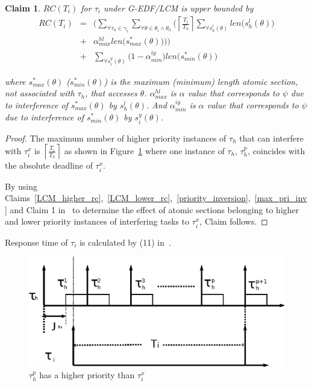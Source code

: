 \documentclass[conference]{IEEEtran}
\newtheorem{clm}{Claim}
\begin{document}
\begin{clm}\label{GEDF/LCM response time}
$RC(T_i)$ for $\tau_i$ under G-EDF/LCM is upper bounded by
\begin{eqnarray}
RC(T_i) & = & \Bigg(\sum_{\forall \tau_h \in \gamma_i}\sum_{\forall\theta \in \theta_i \wedge \theta_h}\Bigg(\left\lceil\frac{T_{i}}{T_{h}}\right\rceil\sum_{\forall s_{h}^{l}(\theta)}len\Big(s_{h}^{l}(\theta)\Big)\nonumber\\
& + & \alpha_{max}^{hl}len\Big(s_{max}^{*}(\theta)\Big)\Bigg)\Bigg)\nonumber\\
& + & \sum_{\forall s_{i}^{y}(\theta)}\Big(1-\alpha_{min}^{iy}\Big)len\Big(s_{min}^*(\theta)\Big)  
\label{eq78}\end{eqnarray} 

where $s_{max}^* (\theta)$ ($s_{min}^*(\theta)$) is the maximum (minimum) length atomic section, not associated with $\tau_h$, that accesses $\theta$. $\alpha_{max}^{hl}$ is $\alpha$ value that corresponds to $\psi$ due to interference of $s_{max}^*(\theta)$ by $s_h^l(\theta)$. And $\alpha_{min}^{iy}$ is $\alpha$ value that corresponds to $\psi$ due to interference of $s_{min}^*(\theta)$ by $s_i^y(\theta)$.
\end{clm}

\begin{proof}
The maximum number of higher priority instances of $\tau_h$ that can interfere with $\tau_i^x$ is $\left\lceil\frac{T_i}{T_h}\right\rceil$ as shown in Figure~\ref{fig17} where one instance of $\tau_h$, $\tau_h^p$, coincides with the absolute deadline of $\tau_i^x$.

By using Claims~\ref{LCM_higher_rc},~\ref{LCM_lower_rc},~\ref{priority_inversion},~\ref{max_pri_inv} and Claim 1 in~\cite{stmconcurrencycontrol:emsoft11} to determine the effect of atomic sections belonging to higher and lower priority instances of interfering tasks to $\tau_i^x$, Claim follows.
\end{proof}


Response time of $\tau_{i}$ is calculated by (11) in~\cite{stmconcurrencycontrol:emsoft11}.
\begin{figure}
\begin{centering}
\includegraphics[scale=0.5]{figures/figure18}
\par\end{centering}
\caption{\label{fig17}$\tau_h^p$ has a higher priority than $\tau_i^x$}
\end{figure}
\end{document}
